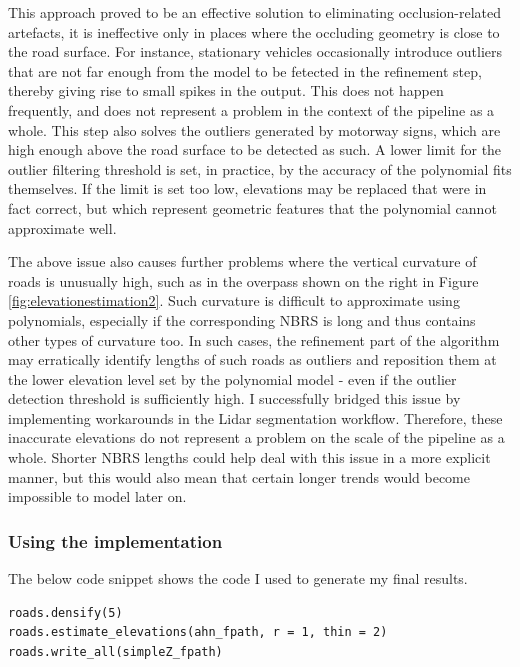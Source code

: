 This approach proved to be an effective solution to eliminating occlusion-related artefacts, it is ineffective only in places where the occluding geometry is close to the road surface. For instance, stationary vehicles occasionally introduce outliers that are not far enough from the model to be fetected in the refinement step, thereby giving rise to small spikes in the output. This does not happen frequently, and does not represent a problem in the context of the pipeline as a whole. This step also solves the outliers generated by motorway signs, which are high enough above the road surface to be detected as such. A lower limit for the outlier filtering threshold is set, in practice, by the accuracy of the polynomial fits themselves. If the limit is set too low, elevations may be replaced that were in fact correct, but which represent geometric features that the polynomial cannot approximate well.

The above issue also causes further problems where the vertical curvature of roads is unusually high, such as in the overpass shown on the right in Figure \ref{fig:elevationestimation2}. Such curvature is difficult to approximate using polynomials, especially if the corresponding NBRS is long and thus contains other types of curvature too. In such cases, the refinement part of the algorithm may erratically identify lengths of such roads as outliers and reposition them at the lower elevation level set by the polynomial model - even if the outlier detection threshold is sufficiently high. I successfully bridged this issue by implementing workarounds in the Lidar segmentation workflow. Therefore, these inaccurate elevations do not represent a problem on the scale of the pipeline as a whole. Shorter NBRS lengths could help deal with this issue in a more explicit manner, but this would also mean that certain longer trends would become impossible to model later on.

\subsubsection{Using the implementation}

The below code snippet shows the code I used to generate my final results.

\begin{lstlisting}
roads.densify(5)
roads.estimate_elevations(ahn_fpath, r = 1, thin = 2)
roads.write_all(simpleZ_fpath)
\end{lstlisting}

